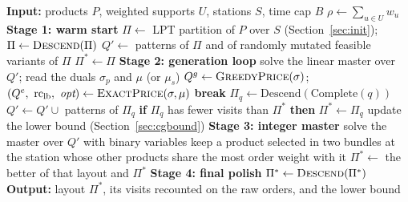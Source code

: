 \documentclass[]{interact}
\begin{document}
\begin{algorithm}[H]
\caption{Price-and-complete drive for the set-partitioning master}
\label{alg:cgdrive}
\begin{algorithmic}[1]
\State \textbf{Input:} products $P$, weighted supports $U$, stations $S$, time cap $B$
\State $\rho\gets\sum_{u\in U}w_u$ 
\Statex
\State \textbf{Stage 1: warm start}
\State $\Pi\gets$ LPT partition of $P$ over $S$ (Section~\ref{sec:init}); $\Pi\gets\Call{Descend}{\Pi}$
\State $Q'\gets$ patterns of $\Pi$ and of randomly mutated feasible variants of $\Pi$
\State $\Pi^{\ast}\gets\Pi$
\Statex
\State \textbf{Stage 2: generation loop}
  \State solve the linear master over $Q'$; read the duals $\sigma_p$ and $\mu$ (or $\mu_s$) 
  \State $Q^{g}\gets\Call{GreedyPrice}{\sigma}$; $(Q^{e},\ \mathrm{rc}_{\mathrm{lb}},\ \textit{opt})\gets\Call{ExactPrice}{\sigma,\mu}$
    \State \textbf{break} 
  \EndIf
    \State $\Pi_q \gets \mathrm{Descend}(\mathrm{Complete}(q))$
      \State $Q'\gets Q'\cup$ patterns of $\Pi_q$
      \State \textbf{if} $\Pi_q$ has fewer visits than $\Pi^{\ast}$ \textbf{then} $\Pi^{\ast}\gets\Pi_q$
    \EndIf
  \EndFor
  \State update the lower bound (Section~\ref{sec:cgbound})
\EndWhile
\Statex
\State \textbf{Stage 3: integer master}
\State solve the master over $Q'$ with binary variables
\State keep a product selected in two bundles at the station whose other products share the most order weight with it 
\State $\Pi^{\ast}\gets$ the better of that layout and $\Pi^{\ast}$
\Statex
\State \textbf{Stage 4: final polish}
\State $\Pi^{\ast}\gets\Call{Descend}{\Pi^{\ast}}$
\State \textbf{Output:} layout $\Pi^{\ast}$, its visits recounted on the raw orders, and the lower bound
\end{algorithmic}
\end{algorithm}
\end{document}
